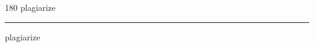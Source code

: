 
\begin{frame}
\begin{center}
\begin{turn}{180}
{\fontsize{2.5cm}{1em}\selectfont plagiarize}
\end{turn}
\vspace{1em}\par  
\hrule
\vspace{1em}\par  
{\fontsize{2.5cm}{1em}\selectfont plagiarize}
\end{center}
\end{frame}
